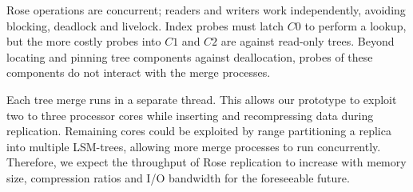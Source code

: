 \documentclass{vldb}
\newcommand{\rows}{Rose\xspace}
\newcommand{\rowss}{Rose's\xspace}
\begin{document}
\rows operations are concurrent; readers and writers work
independently, avoiding blocking, deadlock and livelock.  Index probes
must latch $C0$ to perform a lookup, but the more costly
probes into $C1$ and $C2$ are against read-only trees.  Beyond locating
and pinning tree components against deallocation, probes of these
components do not interact with the merge processes.

Each tree merge runs in a separate thread.  This
allows our prototype to exploit two to three processor cores while
inserting and recompressing data during replication.  Remaining cores
could be exploited by range partitioning a replica into multiple
LSM-trees, allowing more merge processes to run concurrently.
Therefore, we expect the throughput of \rows replication to increase
with memory size, compression ratios and I/O bandwidth for the foreseeable future.




\end{document}
